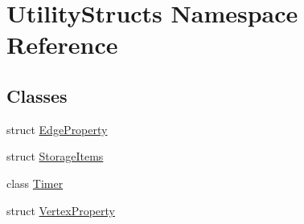 \hypertarget{namespace_utility_structs}{}\section{Utility\+Structs Namespace Reference}
\label{namespace_utility_structs}
\subsection*{Classes}
\begin{DoxyCompactItemize}
\item 
struct \hyperlink{struct_utility_structs_1_1_edge_property}{Edge\+Property}
\item 
struct \hyperlink{struct_utility_structs_1_1_storage_items}{Storage\+Items}
\item 
class \hyperlink{class_utility_structs_1_1_timer}{Timer}
\item 
struct \hyperlink{struct_utility_structs_1_1_vertex_property}{Vertex\+Property}
\end{DoxyCompactItemize}
